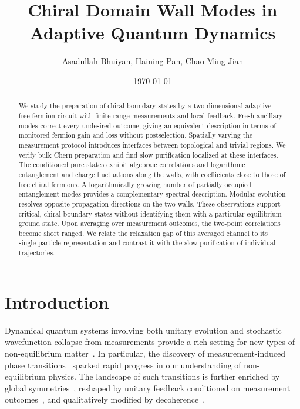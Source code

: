 \documentclass[aps,prb,10pt,twocolumn,superscriptaddress,longbibliography,floatfix]{revtex4-2}
\begin{document}
\raggedbottom

\title{Chiral Domain Wall Modes in Adaptive Quantum Dynamics}
\author{Asadullah Bhuiyan, Haining Pan, Chao-Ming Jian}
\noaffiliation
\date{\today}

\begin{abstract}
{\color{blue}
We study the preparation of chiral boundary states by a two-dimensional adaptive free-fermion circuit with finite-range measurements and local feedback. Fresh ancillary modes correct every undesired outcome, giving an equivalent description in terms of monitored fermion gain and loss without postselection. Spatially varying the measurement protocol introduces interfaces between topological and trivial regions. We verify bulk Chern preparation and find slow purification localized at these interfaces. The conditioned pure states exhibit algebraic correlations and logarithmic entanglement and charge fluctuations along the walls, with coefficients close to those of free chiral fermions. A logarithmically growing number of partially occupied entanglement modes provides a complementary spectral description. Modular evolution resolves opposite propagation directions on the two walls. These observations support critical, chiral boundary states without identifying them with a particular equilibrium ground state. Upon averaging over measurement outcomes, the two-point correlations become short ranged. We relate the relaxation gap of this averaged channel to its single-particle representation and contrast it with the slow purification of individual trajectories.
}
\end{abstract}

\maketitle

\setcounter{tocdepth}{2}
\tableofcontents

\section{Introduction}

Dynamical quantum systems involving both unitary evolution and stochastic wavefunction collapse from measurements provide a rich setting for new types of non-equilibrium matter~\cite{PotterVasseur2022,FisherKhemaniNahumVijay2023}.
In particular, the discovery of measurement-induced phase
transitions~\cite{LiChenFisher2018,SkinnerRuhmanNahum2019,ChanNandkishorePretkoSmith2019,LiChenFisher2019,GullansHuse2020}
sparked rapid progress in our understanding of non-equilibrium physics. The landscape of such transitions is further enriched by global symmetries~\cite{SangHsieh2021,BaoChoiAltman2021,LavasaniAlaviradBarkeshli2021,AgrawalEtAl2022,BarrattEtAl2022,MajidyEtAl2023}, reshaped by unitary feedback conditioned on measurement outcomes~\cite{IadecolaEtAl2023,RavindranathEtAl2023,PiroliEtAl2023,SierantTurkeshi2023,ODeaEtAl2024}, and qualitatively modified by
decoherence~\cite{WeinsteinBaoAltman2022,LiSangHsieh2023,LiuLiZhangJian2024,IvakiOjanenMoghaddam2025}.
\end{document}
